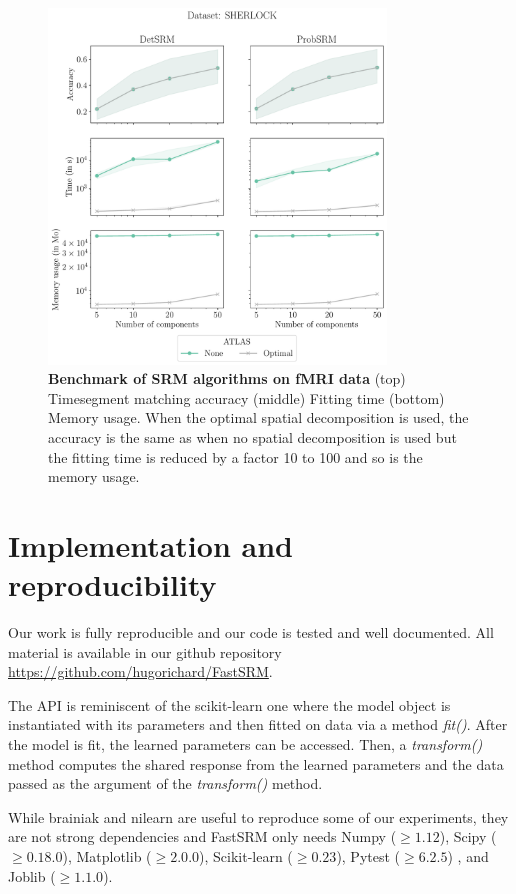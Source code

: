 \documentclass{article}
\begin{document}
\begin{figure}
  \centering
  \includegraphics[width=0.8\textwidth]{../figures/timesegment_matching_sherlock.pdf}
  \caption{\textbf{Benchmark of SRM algorithms on fMRI data} (top) Timesegment
    matching accuracy (middle) Fitting time (bottom) Memory usage. When the
    optimal spatial decomposition is used, the accuracy is the same as when no
    spatial decomposition is used but
    the fitting time is reduced by a factor 10 to 100 and so is the memory usage.
  }
  \label{fig:srm:timesegment}
\end{figure}

\section{Implementation and reproducibility}
Our work is fully reproducible and our code is tested and well documented. All
material is available in our github repository \url{https://github.com/hugorichard/FastSRM}.

The API is reminiscent of the scikit-learn one where the model object is
instantiated with its parameters and then fitted on data via a method
\emph{fit()}. After the model is fit, the learned parameters can be accessed.
Then, a \emph{transform()} method computes the shared
response from the learned parameters and the data passed as the argument of the \emph{transform()} method.

While brainiak and nilearn are useful to reproduce some of our experiments, they
are not strong dependencies and FastSRM only needs Numpy ($\geq 1.12$), Scipy
($\geq 0.18.0$), Matplotlib ($\geq 2.0.0$), Scikit-learn ($\geq 0.23$), Pytest
($\geq 6.2.5$) , and Joblib ($\geq 1.1.0$).
\end{document}
